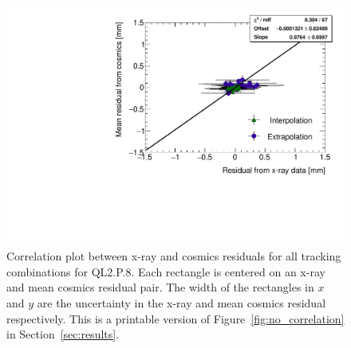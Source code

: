 \begin{figure}
    \centering
    \includegraphics[width = \textwidth]{figures/figure_QL2P08_3100V_2021-08-16_QL2P08_local_cosmic_and_xray_data_correlation_plot_printable.pdf}
    \caption{Correlation plot between x-ray and cosmics residuals for all tracking combinations for QL2.P.8. Each rectangle is centered on an x-ray and mean cosmics residual pair. The width of the rectangles in $x$ and $y$ are the uncertainty in the x-ray and mean cosmics residual respectively. This is a printable version of Figure~\ref{fig:no_correlation} in Section~\ref{sec:results}.}
    \label{fig:no_correlation_print}
\end{figure}
